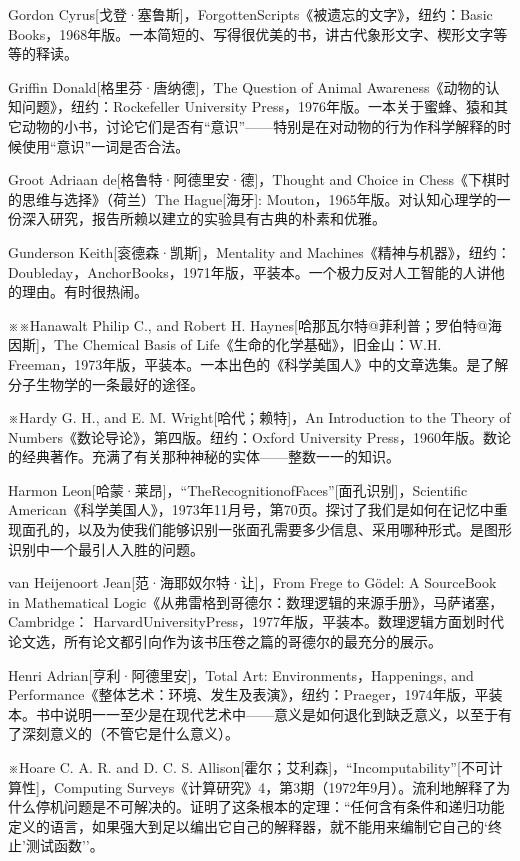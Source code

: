 \documentclass[
  12pt,
  twoside,
  openright,
  oldfontcommands,
]{memoir}
\begin{document}
Gordon Cyrus{[}戈登·塞鲁斯{]}，ForgottenScripts《被遗忘的文字》，纽约：Basic Books，1968年版。一本简短的、写得很优美的书，讲古代象形文字、楔形文字等等的释读。

Griffin Donald{[}格里芬·唐纳德{]}，The Question of Animal Awareness《动物的认知问题》，纽约：Rockefeller University Press，1976年版。一本关于蜜蜂、猿和其它动物的小书，讨论它们是否有``意识''------特别是在对动物的行为作科学解释的时候使用``意识''一词是否合法。

Groot Adriaan de{[}格鲁特·阿德里安·德{]}，Thought and Choice in Chess《下棋时的思维与选择》（荷兰）The Hague{[}海牙{]}: Mouton，1965年版。对认知心理学的一份深入研究，报告所赖以建立的实验具有古典的朴素和优雅。

Gunderson Keith{[}衮德森·凯斯{]}，Mentality and Machines《精神与机器》，纽约：Doubleday，AnchorBooks，1971年版，平装本。一个极力反对人工智能的人讲他的理由。有时很热闹。

※※Hanawalt Philip C., and Robert H. Haynes{[}哈那瓦尔特@菲利普；罗伯特@海因斯{]}，The Chemical Basis of Life《生命的化学基础》，旧金山：W.H. Freeman，1973年版，平装本。一本出色的《科学美国人》中的文章选集。是了解分子生物学的一条最好的途径。

※Hardy G. H., and E. M. Wright{[}哈代；赖特{]}，An Introduction to the Theory of Numbers《数论导论》，第四版。纽约：Oxford University Press，1960年版。数论的经典著作。充满了有关那种神秘的实体------整数一一的知识。

Harmon Leon{[}哈蒙·莱昂{]}，``TheRecognitionofFaces''{[}面孔识别{]}，Scientific American《科学美国人》，1973年11月号，第70页。探讨了我们是如何在记忆中重现面孔的，以及为使我们能够识别一张面孔需要多少信息、采用哪种形式。是图形识别中一个最引人入胜的问题。

van Heijenoort Jean{[}范·海耶奴尔特·让{]}，From Frege to Gödel: A SourceBook in Mathematical Logic《从弗雷格到哥德尔：数理逻辑的来源手册》，马萨诸塞，Cambridge： HarvardUniversityPress，1977年版，平装本。数理逻辑方面划时代论文选，所有论文都引向作为该书压卷之篇的哥德尔的最充分的展示。

Henri Adrian{[}亨利·阿德里安{]}，Total Art: Environments，Happenings, and Performance《整体艺术：环境、发生及表演》，纽约：Praeger，1974年版，平装本。书中说明一一至少是在现代艺术中------意义是如何退化到缺乏意义，以至于有了深刻意义的（不管它是什么意义）。

※Hoare C. A. R. and D. C. S. Allison{[}霍尔；艾利森{]}，``Incomputability''{[}不可计算性{]}，Computing Surveys《计算研究》4，第3期（1972年9月）。流利地解释了为什么停机问题是不可解决的。证明了这条根本的定理：``任何含有条件和递归功能定义的语言，如果强大到足以编出它自己的解释器，就不能用来编制它自己的`终止'测试函数''。
\end{document}
